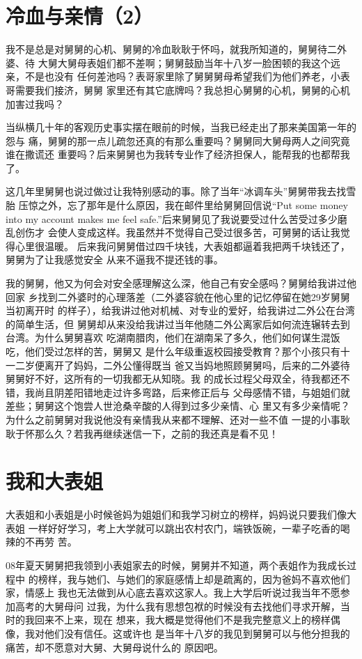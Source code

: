 \documentclass[12pt]{book}
\begin{document}
\section{冷血与亲情（2）}
\label{sec-9-80}

我不是总是对舅舅的心机、舅舅的冷血耿耿于怀吗，就我所知道的，舅舅待二外婆、待
大舅大舅母表姐们都不差啊；舅舅鼓励当年十八岁一脸困顿的我这个远亲，不是也没有
任何差池吗？表哥家里除了舅舅舅母希望我们为他们养老，小表哥需要我们接济，舅舅
家里还有其它底牌吗？我总担心舅舅的心机，舅舅的心机加害过我吗？

当纵横几十年的客观历史事实摆在眼前的时候，当我已经走出了那来美国第一年的怨与
痛，舅舅的那一点儿疏忽还真的有那么重要吗？舅舅同大舅母两人之间究竟谁在撒谎还
重要吗？后来舅舅也为我转专业作了经济担保人，能帮我的也都帮我了。

这几年里舅舅也说过做过让我特别感动的事。除了当年“冰调车头”舅舅带我去找雪胎
压惊之外，忘了那年是什么原因，我在邮件里给舅舅回信说“Put some money into my
account makes me feel safe.”后来舅舅见了我说要受过什么苦受过多少磨乱创伤才
会使人变成这样。我虽然并不觉得自己受过很多苦，可舅舅的话让我觉得心里很温暖。
后来我问舅舅借过四千块钱，大表姐都逼着我把两千块钱还了，舅舅为了让我感觉安全
从来不逼我不提还钱的事。

我的舅舅，他又为何会对安全感理解这么深，他自己有安全感吗？舅舅给我讲过他回家
乡找到二外婆时的心理落差（二外婆容貌在他心里的记忆停留在她29岁舅舅当初离开时
的样子），给我讲过他对机械、对专业的爱好，给我讲过二外公在台湾的简单生活，但
舅舅却从来没给我讲过当年他随二外公离家后如何流连辗转去到台湾。为什么舅舅喜欢
吃湖南腊肉，他们在湖南呆了多久，他们如何谋生混饭吃，他们受过怎样的苦，舅舅又
是什么年级重返校园接受教育？那个小孩只有十一二岁便离开了妈妈，二外公懂得既当
爸又当妈地照顾舅舅吗，后来的二外婆待舅舅好不好，这所有的一切我都无从知晓。我
的成长过程父母双全，待我都还不错，我尚且阴差阳错地走过许多弯路，后来修正后与
父母感情不错，与姐姐们就差些；舅舅这个饱尝人世沧桑辛酸的人得到过多少亲情、心
里又有多少亲情呢？为什么之前舅舅对我说他没有亲情我从来都不理解、还对一些不值
一提的小事耿耿于怀那么久？若我再继续迷信一下，之前的我还真是看不见！
\section{我和大表姐}
\label{sec-9-81}

大表姐和小表姐是小时候爸妈为姐姐们和我学习树立的榜样，妈妈说只要我们像大表姐
一样好好学习，考上大学就可以跳出农村农门，端铁饭碗，一辈子吃香的喝辣的不再劳
苦。

08年夏天舅舅把我领到小表姐家去的时候，舅舅并不知道，两个表姐作为我成长过程中
的榜样，我与她们、与她们的家庭感情上却是疏离的，因为爸妈不喜欢他们家，情感上
我也无法做到从心底去喜欢这家人。我上大学后听说过我当年不愿参加高考的大舅母问
过我，为什么我有思想包袱的时候没有去找他们寻求开解，当时的我回来不上来，现在
想来，我大概是觉得他们不是我完整意义上的榜样偶像，我对他们没有信任。这或许也
是当年十八岁的我见到舅舅可以与他分担我的痛苦，却不愿意对大舅、大舅母说什么的
原因吧。
\end{document}
